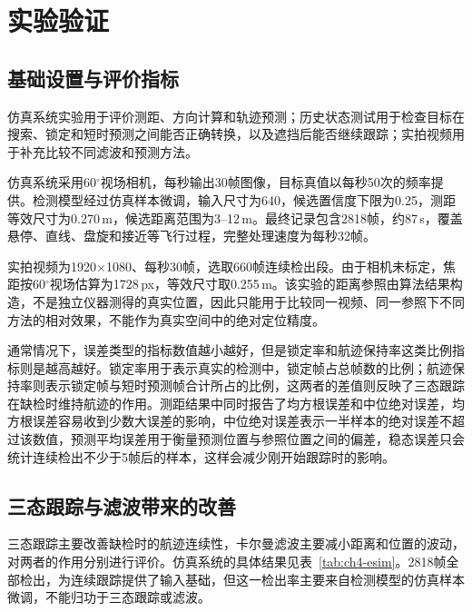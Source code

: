 \section{实验验证}

\subsection{基础设置与评价指标}

仿真系统实验用于评价测距、方向计算和轨迹预测；历史状态测试用于检查目标在搜索、锁定和短时预测之间能否正确转换，以及遮挡后能否继续跟踪；实拍视频用于补充比较不同滤波和预测方法。

仿真系统采用60$^{\circ}$视场相机，每秒输出30帧图像，目标真值以每秒50次的频率提供。检测模型经过仿真样本微调，输入尺寸为640，候选置信度下限为0.25，测距等效尺寸为0.270\,m，候选距离范围为3--12\,m。最终记录包含2818帧，约87\,s，覆盖悬停、直线、盘旋和接近等飞行过程，完整处理速度为每秒32帧。

实拍视频为1920$\times$1080、每秒30帧，选取660帧连续检出段。由于相机未标定，焦距按60$^{\circ}$视场估算为1728\,px，等效尺寸取0.255\,m。该实验的距离参照由算法结果构造，不是独立仪器测得的真实位置，因此只能用于比较同一视频、同一参照下不同方法的相对效果，不能作为真实空间中的绝对定位精度。

通常情况下，误差类型的指标数值越小越好，但是锁定率和航迹保持率这类比例指标则是越高越好。锁定率用于表示真实的检测中，锁定帧占总帧数的比例；航迹保持率则表示锁定帧与短时预测帧合计所占的比例，这两者的差值则反映了三态跟踪在缺检时维持航迹的作用。测距结果中同时报告了均方根误差和中位绝对误差，均方根误差容易收到少数大误差的影响，中位绝对误差表示一半样本的绝对误差不超过该数值，预测平均误差用于衡量预测位置与参照位置之间的偏差，稳态误差只会统计连续检出不少于5帧后的样本，这样会减少刚开始跟踪时的影响。

\subsection{三态跟踪与滤波带来的改善}

三态跟踪主要改善缺检时的航迹连续性，卡尔曼滤波主要减小距离和位置的波动，对两者的作用分别进行评价。仿真系统的具体结果见表~\ref{tab:ch4-esim}。2818帧全部检出，为连续跟踪提供了输入基础，但这一检出率主要来自检测模型的仿真样本微调，不能归功于三态跟踪或滤波。

